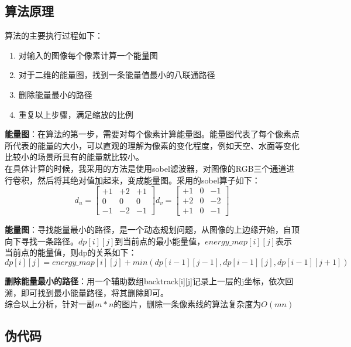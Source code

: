 \documentclass[UTF8]{ctexart}
\begin{document}
\subsection{算法原理}

算法的主要执行过程如下：
\begin{enumerate}
    \item 对输入的图像每个像素计算一个能量图
    \item 对于二维的能量图，找到一条能量值最小的八联通路径
    \item 删除能量最小的路径
    \item 重复以上步骤，满足缩放的比例
\end{enumerate}

\textbf{能量图}：在算法的第一步，需要对每个像素计算能量图。能量图代表了每个像素点所代表的能量的大小，可以直观的理解为像素的变化程度，例如天空、水面等变化比较小的场景所具有的能量就比较小。\\
在具体计算的时候，我采用的方法是使用sobel滤波器，对图像的RGB三个通道进行卷积，然后将其绝对值加起来，变成能量图。采用的sobel算子如下：
\begin{equation*}
    d_u = 
    \begin{bmatrix}
        +1 & +2 & +1 \\
        0 & 0 & 0 \\
        -1 & -2 & -1
    \end{bmatrix} 
    d_v = 
    \begin{bmatrix}
        +1 & 0 & -1 \\
        +2 & 0 & -2 \\
        +1 & 0 & -1
    \end{bmatrix}     
\end{equation*}

\textbf{能量图}：寻找能量最小的路径，是一个动态规划问题，从图像的上边缘开始，自顶向下寻找一条路径。$dp[i][j]$到当前点的最小能量值，$energy\_map[i][j]$表示当前点的能量值，则dp的关系如下：
\begin{equation*}
    dp[i][j] = energy\_map[i][j] + min(dp[i-1][j-1], dp[i-1][j], dp[i-1][j+1])
\end{equation*}

\textbf{删除能量最小的路径}：用一个辅助数组backtrack[i][j]记录上一层的j坐标，依次回溯，即可找到最小能量路径，将其删除即可。\\

综合以上分析，针对一副$m*n$的图片，删除一条像素线的算法复杂度为$O(mn)$

\subsection{伪代码}
\end{document}
